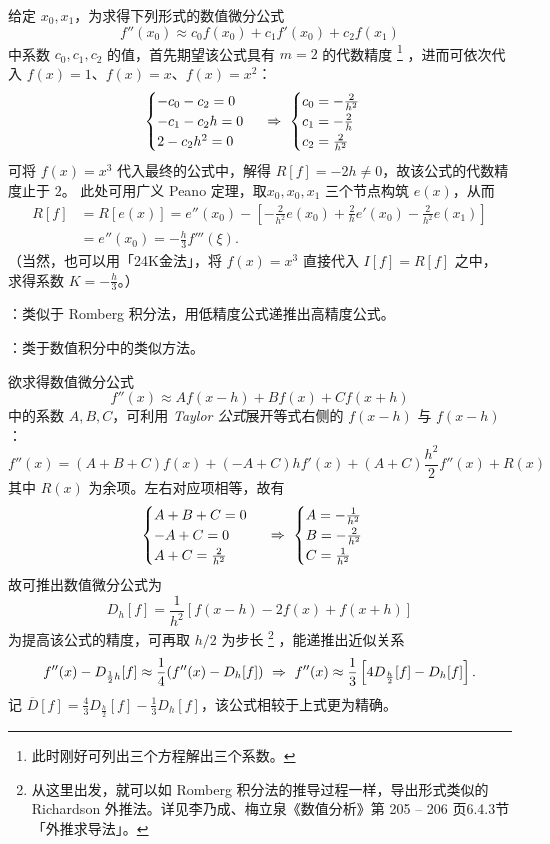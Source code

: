 \example 给定 $x_0,x_1$，为求得下列形式的数值微分公式
\[ f''(x_0)\approx c_0f(x_0)+c_1f'(x_0)+c_2f(x_1) \]
中系数 $c_0,c_1,c_2$ 的值，首先期望该公式具有 $m=2$ 的代数精度
\footnote{此时刚好可列出三个方程解出三个系数。}
，进而可依次代入
$f(x)=1$、$f(x)=x$、$f(x)=x^2$：
\[\begin{cases}-c_0-c_2=0\\-c_1-c_2h=0\\2-c_2h^2=0\end{cases}\ \Rightarrow\ 
\begin{cases}c_0=-\frac{2}{h^2}\\c_1=-\frac2h\\c_2=\frac2{h^2}\end{cases}\]
可将 $f(x)=x^3$ 代入最终的公式中，解得 $R[f]=-2h\neq0$，故该公式的代数精度止于 $2$。
此处可用广义 Peano 定理，取$x_0,x_0,x_1$ 三个节点构筑 $e(x)$，从而
\[\begin{aligned}
R[f]&=R[e(x)]=e''(x_0)-\left[-\frac2{h^2}e(x_0)+\frac2he'(x_0)-\frac2{h^2}e(x_1)\right]\\
&=e''(x_0)=-\frac h3f'''(\xi).
\end{aligned}\]
（当然，也可以用「24K金法」，将 $f(x)=x^3$ 直接代入 $I[f]=R[f]$ 之中，
求得系数 $K=-\frac h3$。）

\entry {}：类似于 Romberg 积分法，用低精度公式递推出高精度公式。

\entry {}：类于数值积分中的类似方法。

\example 欲求得数值微分公式
\[ f''(x)\approx Af(x-h)+Bf(x)+Cf(x+h) \]
中的系数 $A,B,C$，可利用 \emph{Taylor 公式}展开等式右侧的 $f(x-h)$ 与 $f(x-h)$：
\[ f''(x)=(A+B+C)f(x)+(-A+C)hf'(x)+(A+C)\frac{h^2}2f''(x)+R(x) \]
其中 $R(x)$ 为余项。左右对应项相等，故有
\[
\begin{cases}A+B+C=0\\-A+C=0\\A+C=\frac2{h^2}\end{cases}\ \Rightarrow\ 
\begin{cases}A=-\frac1{h^2}\\B=-\frac2{h^2}\\C=\frac1{h^2}\end{cases}
\]
故可推出数值微分公式为
\[ D_h[f]=\frac1{h^2}[f(x-h)-2f(x)+f(x+h)] \]
为提高该公式的精度，可再取 $h/2$ 为步长
\footnote{从这里出发，就可以如 Romberg 积分法的推导过程一样，导出形式类似的 Richardson 外推法。详见李乃成、梅立泉《数值分析》第 205 -- 206 页6.4.3节「外推求导法」。}
，能递推出近似关系
\[ f''(x)-D_{\frac12h}[f]\approx\frac14(f''(x)-D_h[f])\ \Rightarrow\ 
f''(x)\approx\frac13\left[4D_{\frac h2}[f]-D_h[f]\right]. \]
记 $\overline{D}[f]=\frac43D_{\frac h2}[f]-\frac13D_h[f]$，该公式相较于上式更为精确。